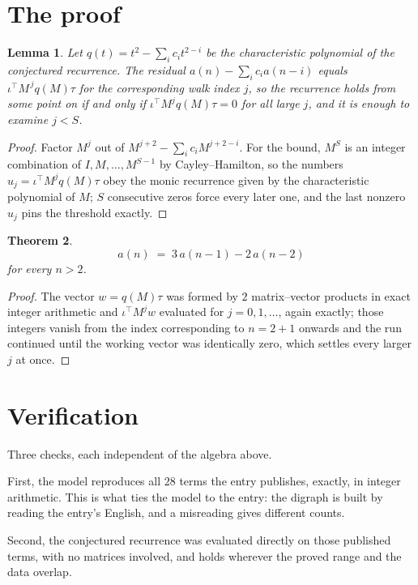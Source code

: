 \documentclass[11pt,a4paper]{article}
\theoremstyle{plain}
\newtheorem{theorem}{Theorem}
\newtheorem{lemma}[theorem]{Lemma}
\theoremstyle{definition}
\begin{document}
\section{The proof}

\begin{lemma}\label{lem:crit}
Let $q(t)=t^{2}-\sum_i c_it^{2-i}$ be the characteristic polynomial of the
conjectured recurrence. The residual $a(n)-\sum_ic_ia(n-i)$ equals
$\iota^{\!\top}M^{\,j}q(M)\tau$ for the corresponding walk index $j$, so the recurrence
holds from some point on if and only if $\iota^{\!\top}M^{j}q(M)\tau=0$ for all large $j$,
and it is enough to examine $j<S$.
\end{lemma}

\begin{proof}
Factor $M^{j}$ out of $M^{j+2}-\sum_ic_iM^{j+2-i}$. For the bound, $M^{S}$
is an integer combination of $I,M,\dots,M^{S-1}$ by Cayley--Hamilton, so the numbers
$u_j=\iota^{\!\top}M^{j}q(M)\tau$ obey the monic recurrence given by the characteristic
polynomial of $M$; $S$ consecutive zeros force every later one, and the last nonzero $u_j$
pins the threshold exactly.
\end{proof}

\begin{theorem}
\[
a(n)\;=\;3\,a(n-1) - 2\,a(n-2)
\]
for every $n>2$.
\end{theorem}

\begin{proof}
The vector $w=q(M)\tau$ was formed by $2$ matrix--vector products in exact integer
arithmetic and $\iota^{\!\top}M^{j}w$ evaluated for $j=0,1,\dots$, again exactly; those
integers vanish from the index corresponding to $n=2+1$ onwards and the run continued
until the working vector was identically zero, which settles every larger $j$ at once.
\end{proof}

\section{Verification}

Three checks, each independent of the algebra above.

First, the model reproduces all $28$ terms the entry publishes, exactly, in integer
arithmetic. This is what ties the model to the entry: the digraph is built by reading the
entry's English, and a misreading gives different counts.

Second, the conjectured recurrence was evaluated directly on those published terms, with no
matrices involved, and holds wherever the proved range and the data overlap.
\end{document}
